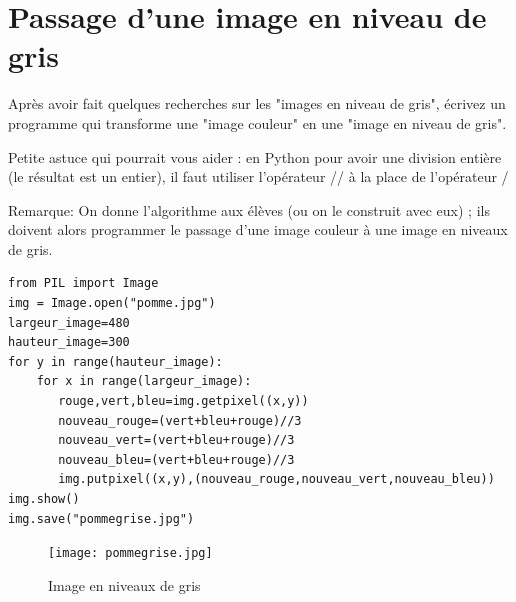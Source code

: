 \documentclass[11pt]{article}
\begin{document}
\section{Passage d'une image en niveau de gris}
\label{sec:org45bf4bd}

Après avoir fait quelques recherches sur les "images en niveau de gris", écrivez un programme qui transforme une "image couleur" en une "image en niveau de gris".

Petite astuce qui pourrait vous aider : en Python pour avoir une division entière (le résultat est un entier), il faut utiliser l'opérateur // à la place de l'opérateur / 

Remarque: On donne l'algorithme aux élèves (ou on le construit avec eux) ; ils doivent alors programmer le passage d'une image couleur à une image en niveaux de gris.


\begin{verbatim}
from PIL import Image
img = Image.open("pomme.jpg")
largeur_image=480
hauteur_image=300
for y in range(hauteur_image):
    for x in range(largeur_image):
       rouge,vert,bleu=img.getpixel((x,y))
       nouveau_rouge=(vert+bleu+rouge)//3
       nouveau_vert=(vert+bleu+rouge)//3
       nouveau_bleu=(vert+bleu+rouge)//3
       img.putpixel((x,y),(nouveau_rouge,nouveau_vert,nouveau_bleu))
img.show()
img.save("pommegrise.jpg")
\end{verbatim}

\begin{figure}[htbp]
\centering
\texttt{[image: pommegrise.jpg]}
\caption{Image en niveaux de gris}
\end{figure}
\end{document}
